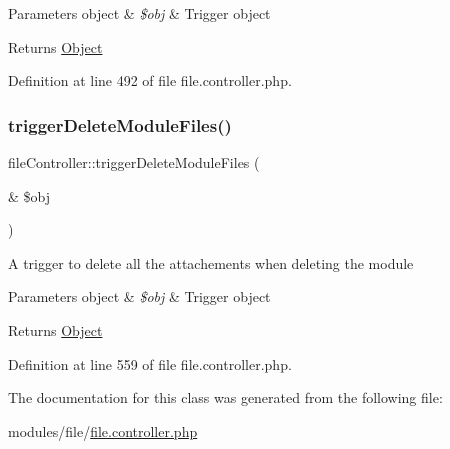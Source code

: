 \begin{DoxyParams}[1]{Parameters}
object & {\em \$obj} & Trigger object \\
\hline
\end{DoxyParams}
\begin{DoxyReturn}{Returns}
\hyperlink{classObject}{Object} 
\end{DoxyReturn}


Definition at line 492 of file file.\+controller.\+php.

\hypertarget{classfileController_a68fbf2cdcb182912d4138f269904a1ba}{}\label{classfileController_a68fbf2cdcb182912d4138f269904a1ba} 
\subsubsection{\texorpdfstring{trigger\+Delete\+Module\+Files()}{triggerDeleteModuleFiles()}}
{\footnotesize\ttfamily file\+Controller\+::trigger\+Delete\+Module\+Files (\begin{DoxyParamCaption}\item[{\&}]{\$obj }\end{DoxyParamCaption})}

A trigger to delete all the attachements when deleting the module


\begin{DoxyParams}[1]{Parameters}
object & {\em \$obj} & Trigger object \\
\hline
\end{DoxyParams}
\begin{DoxyReturn}{Returns}
\hyperlink{classObject}{Object} 
\end{DoxyReturn}


Definition at line 559 of file file.\+controller.\+php.



The documentation for this class was generated from the following file\+:\begin{DoxyCompactItemize}
\item 
modules/file/\hyperlink{file_8controller_8php}{file.\+controller.\+php}\end{DoxyCompactItemize}
